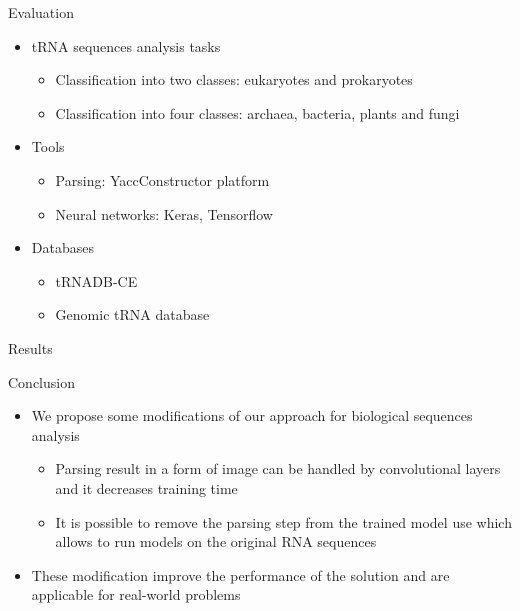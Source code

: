 \documentclass[xcolor=table]{beamer}
\begin{document}
\begin{frame}{Evaluation}
\begin{itemize}
    \item tRNA sequences analysis tasks
    \begin{itemize}
        \item Classification into two classes: eukaryotes and prokaryotes
        \item Classification into four classes: archaea, bacteria, plants and fungi
    \end{itemize}
    \item Tools
    \begin{itemize}
        \item Parsing: YaccConstructor platform
        \item Neural networks: Keras, Tensorflow
    \end{itemize}
    \item Databases
    \begin{itemize}
        \item tRNADB-CE
        \item Genomic tRNA database
    \end{itemize}
\end{itemize}
\end{frame}

\begin{frame}{Results}



\end{frame}

\begin{frame}{Conclusion}
\begin{itemize}
    \item We propose some modifications of our approach for biological sequences analysis
    \begin{itemize}
        \item Parsing result in a form of image can be handled by convolutional layers and it decreases training time
        \item It is possible to remove the parsing step from the trained model use which allows to run models on the original RNA sequences        
    \end{itemize}
    \item These modification improve the performance of the solution and are applicable for real-world problems
\end{itemize}
\end{frame}
\end{document}
